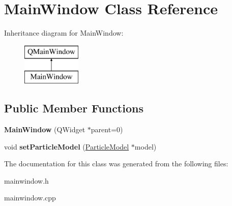 \hypertarget{class_main_window}{\section{Main\-Window Class Reference}
\label{class_main_window}
}
Inheritance diagram for Main\-Window\-:\begin{figure}[H]
\begin{center}
\leavevmode
\includegraphics[height=2.000000cm]{class_main_window}
\end{center}
\end{figure}
\subsection*{Public Member Functions}
\begin{DoxyCompactItemize}
\item 
\hypertarget{class_main_window_a8b244be8b7b7db1b08de2a2acb9409db}{{\bfseries Main\-Window} (Q\-Widget $\ast$parent=0)}\label{class_main_window_a8b244be8b7b7db1b08de2a2acb9409db}

\item 
\hypertarget{class_main_window_ab0f6b9144b6b8188bcbfd4a874cf2cab}{void {\bfseries set\-Particle\-Model} (\hyperlink{class_particle_model}{Particle\-Model} $\ast$model)}\label{class_main_window_ab0f6b9144b6b8188bcbfd4a874cf2cab}

\end{DoxyCompactItemize}


The documentation for this class was generated from the following files\-:\begin{DoxyCompactItemize}
\item 
mainwindow.\-h\item 
mainwindow.\-cpp\end{DoxyCompactItemize}
